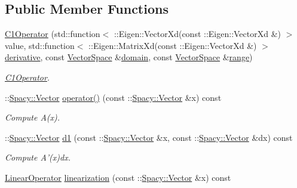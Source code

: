 \subsection*{Public Member Functions}
\begin{DoxyCompactItemize}
\item 
\hyperlink{classSpacy_1_1Rn_1_1C1Operator_ace713dafa8c7422f57f0f1c0a989db12}{C1\-Operator} (std\-::function$<$ \-::Eigen\-::\-Vector\-Xd(const \-::Eigen\-::\-Vector\-Xd \&) $>$ value, std\-::function$<$ \-::Eigen\-::\-Matrix\-Xd(const \-::Eigen\-::\-Vector\-Xd \&) $>$ \hyperlink{namespaceSpacy_a002fe344fa6d04a6ac59a74ea25fddb6}{derivative}, const \hyperlink{classSpacy_1_1VectorSpace}{Vector\-Space} \&\hyperlink{classSpacy_1_1OperatorBase_a2588f9b3e0188820c4c494e63293dc6f}{domain}, const \hyperlink{classSpacy_1_1VectorSpace}{Vector\-Space} \&\hyperlink{classSpacy_1_1OperatorBase_ab19d3b7a6f290b1079248f1e567e53d6}{range})
\begin{DoxyCompactList}\small\item\em \hyperlink{classSpacy_1_1Rn_1_1C1Operator}{C1\-Operator}. \end{DoxyCompactList}\item 
\hypertarget{classSpacy_1_1Rn_1_1C1Operator_a21205efc25688cb7d5f184eeb637df60}{\-::\hyperlink{classSpacy_1_1Vector}{Spacy\-::\-Vector} \hyperlink{classSpacy_1_1Rn_1_1C1Operator_a21205efc25688cb7d5f184eeb637df60}{operator()} (const \-::\hyperlink{classSpacy_1_1Vector}{Spacy\-::\-Vector} \&x) const }\label{classSpacy_1_1Rn_1_1C1Operator_a21205efc25688cb7d5f184eeb637df60}

\begin{DoxyCompactList}\small\item\em Compute A(x). \end{DoxyCompactList}\item 
\hypertarget{classSpacy_1_1Rn_1_1C1Operator_af15f1491a967262ffcfe6d484d440940}{\-::\hyperlink{classSpacy_1_1Vector}{Spacy\-::\-Vector} \hyperlink{classSpacy_1_1Rn_1_1C1Operator_af15f1491a967262ffcfe6d484d440940}{d1} (const \-::\hyperlink{classSpacy_1_1Vector}{Spacy\-::\-Vector} \&x, const \-::\hyperlink{classSpacy_1_1Vector}{Spacy\-::\-Vector} \&dx) const }\label{classSpacy_1_1Rn_1_1C1Operator_af15f1491a967262ffcfe6d484d440940}

\begin{DoxyCompactList}\small\item\em Compute A'(x)dx. \end{DoxyCompactList}\item 
\hypertarget{classSpacy_1_1Rn_1_1C1Operator_a507155c1dbf6f312cf4864b509ed84bc}{\hyperlink{classSpacy_1_1Rn_1_1LinearOperator}{Linear\-Operator} \hyperlink{classSpacy_1_1Rn_1_1C1Operator_a507155c1dbf6f312cf4864b509ed84bc}{linearization} (const \-::\hyperlink{classSpacy_1_1Vector}{Spacy\-::\-Vector} \&x) const }\label{classSpacy_1_1Rn_1_1C1Operator_a507155c1dbf6f312cf4864b509ed84bc}


\end{DoxyCompactItemize}
